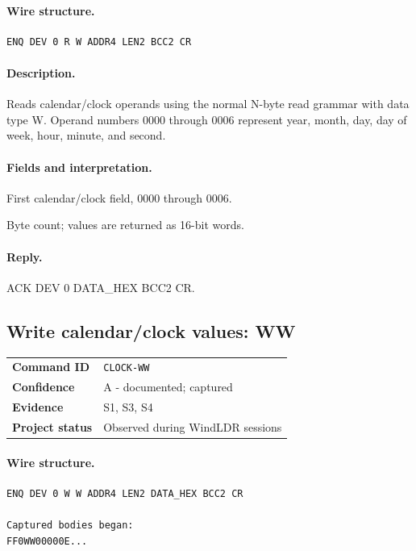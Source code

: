 \documentclass[10pt,letterpaper]{article}
\begin{document}
\paragraph{Wire structure.}
\begin{Verbatim}[breaklines=true,breakanywhere=true,fontsize=\small]
ENQ DEV 0 R W ADDR4 LEN2 BCC2 CR
\end{Verbatim}
\paragraph{Description.} Reads calendar/clock operands using the normal N-byte read grammar with data type W. Operand numbers 0000 through 0006 represent year, month, day, day of week, hour, minute, and second.
\paragraph{Fields and interpretation.}
\begin{description}[style=nextline,leftmargin=3.2cm,labelwidth=3.0cm,font=\normalfont\bfseries]
\item[ADDR4] First calendar/clock field, 0000 through 0006.
\item[LEN2] Byte count; values are returned as 16-bit words.
\end{description}
\paragraph{Reply.} ACK DEV 0 DATA\_HEX BCC2 CR.

\subsection{Write calendar/clock values: WW}
\begin{tabularx}{\textwidth}{@{}>{\bfseries}p{2.8cm}X@{}}
Command ID & \texttt{CLOCK-WW} \\
Confidence & A - documented; captured \\
Evidence & S1, S3, S4 \\
Project status & Observed during WindLDR sessions \\
\end{tabularx}
\vspace{0.35em}
\paragraph{Wire structure.}
\begin{Verbatim}[breaklines=true,breakanywhere=true,fontsize=\small]
ENQ DEV 0 W W ADDR4 LEN2 DATA_HEX BCC2 CR

Captured bodies began:
FF0WW00000E...
\end{Verbatim}
\end{document}
